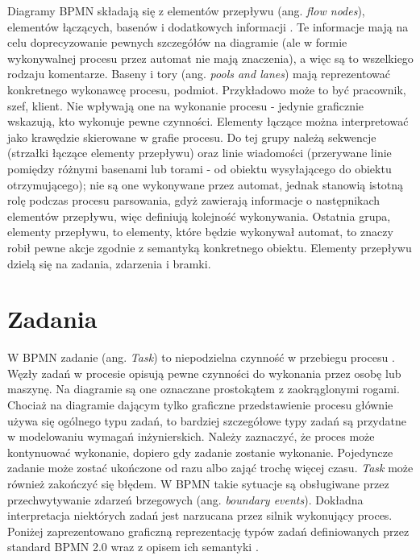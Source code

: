 \documentclass[declaration,shortabstract,mgr]{iithesis}
\newcommand{\bpmn}{BPMN }
\begin{document}
Diagramy \bpmn składają się z elementów przepływu (ang. \emph{flow nodes}), elementów łączących, basenów i dodatkowych informacji \cite{process-maker-bpmn}. Te informacje mają na celu doprecyzowanie pewnych szczegółów na diagramie (ale w formie wykonywalnej procesu przez automat nie mają znaczenia), a więc są to wszelkiego rodzaju komentarze. Baseny i tory (ang. \emph{pools and lanes}) mają reprezentować konkretnego wykonawcę procesu, podmiot. Przykładowo może to być pracownik, szef, klient. Nie wpływają one na wykonanie procesu - jedynie graficznie wskazują, kto wykonuje pewne czynności. Elementy łączące można interpretować jako krawędzie skierowane w grafie procesu. Do tej grupy należą sekwencje (strzałki łączące elementy przepływu) oraz linie wiadomości (przerywane linie pomiędzy różnymi basenami lub torami - od obiektu wysyłającego do obiektu otrzymującego); nie są one wykonywane przez automat, jednak stanowią istotną rolę podczas procesu parsowania, gdyż zawierają informacje o następnikach elementów przepływu, więc definiują kolejność wykonywania. Ostatnia grupa, elementy przepływu, to elementy, które będzie wykonywał automat, to znaczy robił pewne akcje zgodnie z semantyką konkretnego obiektu. Elementy przepływu dzielą się na zadania, zdarzenia i bramki.

\section{Zadania}
W \bpmn zadanie (ang. \textit{Task}) to niepodzielna czynność w przebiegu procesu \cite{bruce-silver-bpmn-tasks}. Węzły zadań w procesie opisują pewne czynności do wykonania przez osobę lub maszynę. Na diagramie są one oznaczane prostokątem z zaokrąglonymi rogami. Chociaż na diagramie dającym tylko graficzne przedstawienie procesu głównie używa się ogólnego typu zadań, to bardziej szczegółowe typy zadań są przydatne w modelowaniu wymagań inżynierskich. Należy zaznaczyć, że proces może kontynuować wykonanie, dopiero gdy zadanie zostanie wykonanie. Pojedyncze zadanie może zostać ukończone od razu albo zająć trochę więcej czasu. \textit{Task} może również zakończyć się błędem. W \bpmn takie sytuacje są obsługiwane przez przechwytywanie zdarzeń brzegowych (ang. \textit{boundary events}). Dokładna interpretacja niektórych zadań jest narzucana przez silnik wykonujący proces. Poniżej zaprezentowano graficzną reprezentację typów zadań definiowanych przez standard \bpmn 2.0 wraz z opisem ich semantyki \cite{visual-paradigm-tasks-explained}.


\newcommand{\mypointsep}{10pt}
\end{document}
